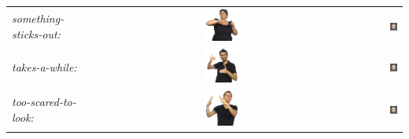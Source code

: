 \documentclass[../../main]{subfiles}
\begin{document}
\begin{longtable}{|l|c|r|}
    \emph{something-sticks-out:} & \includegraphics[width=0.15\textwidth]{chapters/facial_expressions/images/original_facial_expressions/sth_sticks_out.png} & \includegraphics[width=0.15\textwidth]{chapters/facial_expressions/images/synthesized_expressions/something_sticks_out.png} \\
    \emph{takes-a-while:} & \includegraphics[width=0.15\textwidth]{chapters/facial_expressions/images/original_facial_expressions/takes_a_while.png} & \includegraphics[width=0.15\textwidth]{chapters/facial_expressions/images/synthesized_expressions/takes_a_while.png} \\
    \emph{too-scared-to-look:} & \includegraphics[width=0.15\textwidth]{chapters/facial_expressions/images/original_facial_expressions/too_scared_to_look.png} & \includegraphics[width=0.15\textwidth]{chapters/facial_expressions/images/synthesized_expressions/too_scared_to_look.png} \\

\end{longtable}
\end{document}
